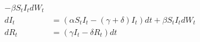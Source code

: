 \begin{frame}
\begin{columns}
\begin{overlayarea}{\textwidth}{.5\textheight}
\begin{exampleblock}
{\begin{align*}
                            - \beta S_t I_t dW_t
                        \\
                        dI_t & = (\alpha S_t I_t - (\gamma + \delta) I_t) dt
                            + \beta S_t I_t dW_t
                        \\
                        dR_t & =
                            (\gamma I_t  - \delta R_t) dt
                    \end{align*}
                }
             \end{exampleblock}
         \end{overlayarea}
    \end{columns}
 \end{frame}
